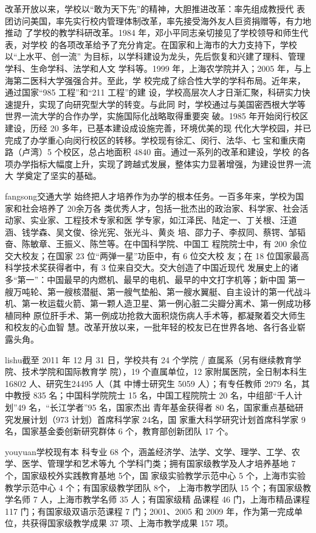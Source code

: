 {\kaishu 改革开放以来，学校以“敢为天下先”的精神，大胆推进改革：率先组成教授代
  表团访问美国，率先实行校内管理体制改革，率先接受海外友人巨资捐赠等，有力地推动
  了学校的教学科研改革。1984 年，邓小平同志亲切接见了学校领导和师生代表，对学校
  的各项改革给予了充分肯定。在国家和上海市的大力支持下，学校以“上水平、创一流”
  为目标，以学科建设为龙头，先后恢复和兴建了理科、管理学科、生命学科、法学和人文
  学科等。1999 年，上海农学院并入；2005 年，与上海第二医科大学强强合并。至此，学
  校完成了综合性大学的学科布局。近年来，通过国家“985 工程”和“211 工程”的建
  设，学校高层次人才日渐汇聚，科研实力快速提升，实现了向研究型大学的转变。与此同
  时，学校通过与美国密西根大学等世界一流大学的合作办学，实施国际化战略取得重要突
  破。1985 年开始闵行校区建设，历经 20 多年，已基本建设成设施完善，环境优美的现
  代化大学校园，并已完成了办学重心向闵行校区的转移。学校现有徐汇、闵行、法华、七
  宝和重庆南路（卢湾）5 个校区，总占地面积 4840 亩。通过一系列的改革和建设，学校
  的各项办学指标大幅度上升，实现了跨越式发展，整体实力显著增强，为建设世界一流大
  学奠定了坚实的基础。}

{\ifcsname fangsong\endcsname\fangsong\else[无 \cs{fangsong} 字体。]\fi 交通大学
  始终把人才培养作为办学的根本任务。一百多年来，学校为国家和社会培养了 20余万各
  类优秀人才，包括一批杰出的政治家、科学家、社会活动家、实业家、工程技术专家和医
  学专家，如江泽民、陆定一、丁关根、汪道涵、钱学森、吴文俊、徐光宪、张光斗、黄炎
  培、邵力子、李叔同、蔡锷、邹韬奋、陈敏章、王振义、陈竺等。在中国科学院、中国工
  程院院士中，有 200 余位交大校友；在国家 23 位“两弹一星”功臣中，有 6 位交大校
  友；在 18 位国家最高科学技术奖获得者中，有 3 位来自交大。交大创造了中国近现代
  发展史上的诸多“第一”：中国最早的内燃机、最早的电机、最早的中文打字机等；新中国
  第一艘万吨轮、第一艘核潜艇、第一艘气垫船、第一艘水翼艇、自主设计的第一代战斗
  机、第一枚运载火箭、第一颗人造卫星、第一例心脏二尖瓣分离术、第一例成功移植同种
  原位肝手术、第一例成功抢救大面积烧伤病人手术等，都凝聚着交大师生和校友的心血智
  慧。改革开放以来，一批年轻的校友已在世界各地、各行各业崭露头角。}

{\ifcsname lishu\endcsname\lishu\else[无 \cs{lishu} 字体。]\fi 截至 2011 年 12
  月 31 日，学校共有 24 个学院 / 直属系（另有继续教育学院、技术学院和国际教育学
  院），19 个直属单位，12 家附属医院，全日制本科生 16802 人、研究生24495 人（其
  中博士研究生 5059 人）；有专任教师 2979 名，其中教授 835 名；中国科学院院士 15
  名，中国工程院院士 20 名，中组部“千人计划”49 名，“长江学者”95 名，国家杰出
  青年基金获得者 80 名，国家重点基础研究发展计划（973 计划）首席科学家 24名，国
  家重大科学研究计划首席科学家 9名，国家基金委创新研究群体 6 个，教育部创新团队
  17 个。}

{\ifcsname youyuan\endcsname\youyuan\else[无 \cs{youyuan} 字体。]\fi 学校现有本
  科专业 68 个，涵盖经济学、法学、文学、理学、工学、农学、医学、管理学和艺术等九
  个学科门类；拥有国家级教学及人才培养基地 7 个，国家级校外实践教育基地 5个，国
  家级实验教学示范中心 5 个，上海市实验教学示范中心 4 个；有国家级教学团队 8个，
  上海市教学团队 15 个；有国家级教学名师 7 人，上海市教学名师 35 人；有国家级精
  品课程 46 门，上海市精品课程 117 门；有国家级双语示范课程 7 门；2001、2005 和
  2009 年，作为第一完成单位，共获得国家级教学成果 37 项、上海市教学成果 157
  项。}
